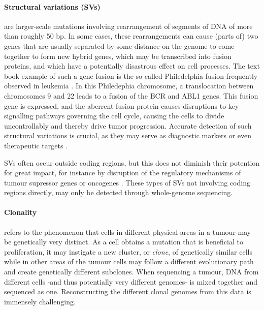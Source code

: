 \paragraph{Structural variations (SVs)} are larger-scale mutations involving rearrangement of segments of DNA of more than roughly 50 bp. In some cases, these rearrangements can cause (parts of) two genes that are usually separated by some distance on the genome to come together to form new hybrid genes, which may be transcribed into fusion proteins, and which have a potentially disastrous effect on cell processes. The text book example of such a gene fusion is the so-called Philedelphia fusion frequently observed in leukemia \cite{TODO}. In this Philedephia chromosome, a translocation between chromosomes 9 and 22 leads to a fusion of the BCR and ABL1 genes. This fusion gene is expressed, and the aberrent fusion protein causes disruptions to key signalling pathways governing the cell cycle, causing the cells to divide uncontrollably and thereby drive tumor progression. Accurate detection of such structural variations is crucial, as they may serve as diagnostic markers \cite{nowell1960chromosome,nowell1961chromosome} or even therapeutic targets \cite{druker2001activity, druker2001efficacy}.

SVs often occur outside coding regions, but this does not diminish their potention for great impact, for instance by disruption of the regulatory mechanisms of tumour supressor genes or oncogenes \cite{TODO}. These types of SVs not involving coding regions directly, may only be detected through whole-genome sequencing.


\paragraph{Clonality} refers to the phenomenon that cells in different physical areas in a tumour may be genetically very distinct. As a cell obtains a mutation that is beneficial to proliferation, it may instigate a new cluster, or \textit{clone}, of genetically similar cells while in other areas of the tumour cells may follow a different evolutionary path and create genetically different subclones. When sequencing a tumour, DNA from different cells -and thus potentially very different genomes- is mixed together and sequenced as one. Reconstructing the different clonal genomes from this data is immensely challenging.

